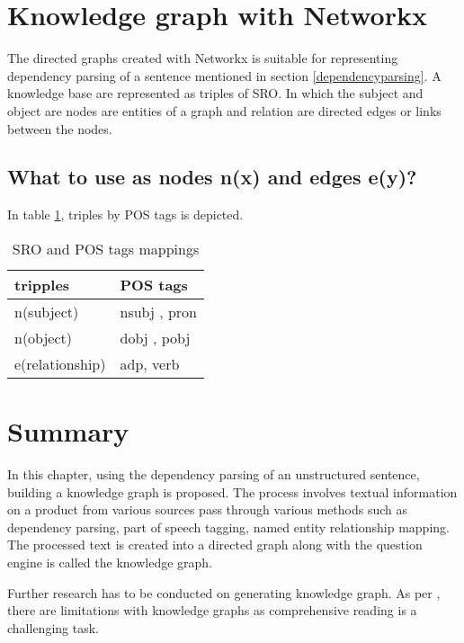 \section{Knowledge graph with Networkx}

The directed graphs created with Networkx \parencite{hagberg2008exploring} is suitable for representing dependency parsing of a sentence mentioned in section \ref{dependencyparsing}. A knowledge base are represented as triples of \acf{SRO}. In which the subject and object are nodes are entities of a graph and relation are directed edges or links between the nodes.

\subsection*{What to use as nodes n(x) and edges e(y)?}

In table \ref{table:SRO},  triples by  \acs{POS} tags is depicted. 


\begin{table}[h]
    \centering
    \caption{\acs{SRO} and \acs{POS} tags mappings}
    \label{table:SRO}
    \begin{tabular}{ ll }
          \toprule
          
          \textbf{tripples}& \textbf{ \acf{POS} tags} \\
          \midrule
          n(subject)& \acs{nsubj} , \acs{pron}     \\
          n(object) & \acs{dobj}    , \acs{pobj}    \\      
          e(relationship) &\acs{adp}, verb  \\       
         
          \bottomrule
          \end{tabular}
\end{table}

\section{Summary}


In this chapter, using the dependency parsing of an unstructured sentence, building a knowledge graph is proposed.  The process involves textual information on a product from various sources pass through various methods such as dependency parsing, part of speech tagging, named entity relationship mapping. The processed text is created into a directed graph along with the question engine is called the knowledge graph.  

Further research has to be conducted on generating knowledge graph. As per \parencite{LisaEhrlinger}, there are limitations with knowledge graphs as comprehensive reading is a challenging task.